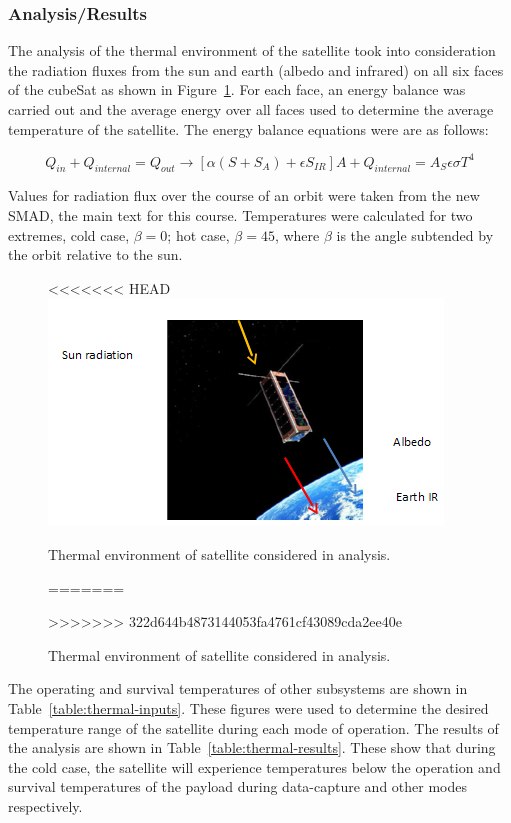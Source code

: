 \documentclass[12pt]{article}
\begin{document}
\subsubsection{Analysis/Results}

The analysis of the thermal environment of the satellite took into consideration the radiation fluxes from the sun and earth (albedo and infrared) on all six faces of the cubeSat as shown in Figure~\ref{fig:thermal-environment}. For each face, an energy balance was carried out and the average energy over all faces used to determine the average temperature of the satellite. The energy balance equations were are as follows:

\begin{equation}
Q_{in} + Q_{internal} = Q_{out} \rightarrow [\alpha(S + S_A) + \epsilon S_{IR}] A + Q_{internal} = A_S \epsilon \sigma T^4
\label{eq:thermal-balance}
\end{equation}		

Values for radiation flux over the course of an orbit were taken from the new SMAD, the main text for this course. Temperatures were calculated for two extremes, cold case, $\beta = 0$; hot case, $\beta =45$, where $\beta$ is the angle subtended by the orbit relative to the sun. 

\begin{figure}[ht]%
\centering
<<<<<<< HEAD
\includegraphics{images/thermal-environment}%
\caption{Thermal environment of satellite considered in analysis.}%
=======
\caption{ Thermal environment of satellite considered in analysis.}%
>>>>>>> 322d644b4873144053fa4761cf43089cda2ee40e
\label{fig:thermal-environment}%
\end{figure}

The operating and survival temperatures of other subsystems are shown in Table~\ref{table:thermal-inputs}. These figures were used to determine the desired temperature range of the satellite during each mode of operation. The results of the analysis are shown in Table~\ref{table:thermal-results}. These show that during the cold case, the satellite will experience temperatures below the operation and survival temperatures of the payload during data-capture and other modes respectively.
\end{document}
